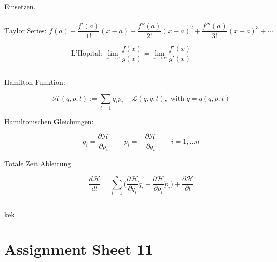 \documentclass{report}
\newcommand{\rm}{\textrm}
\newcommand{\lag}{\mathcal{L}}
\newcommand{\ham}{\mathcal{H}}
\newcommand{\prt}[2]{\frac{\partial #1}{\partial #2}}
\begin{document}
\subsection{}
Einsetzen.

\subsection{}
$$\rm{Taylor Series: }{f(a)+{\frac {f'(a)}{1!}}(x-a)+{\frac{f''(a)}{2!}}(x-a)^{2}+{\frac{f'''(a)}{3!}}(x-a)^{3}+\cdots}$$

$$\rm{L'Hopital: }\lim_{x\rightarrow c}\frac{f(x)}{g(x)}= \lim_{x\rightarrow c}\frac{f'(x)}{g'(x)}$$


\section{}
\begin{description}
\item [Hamilton Funktion:]
$$\ham(q,p,t):={\sum_{i=1}\dot q_i p_i}- \lag( q , \dot q , t ) ,  \textrm{ with  }\dot q = \dot q ( q , p , t )$$
\item [Hamiltonischen Gleichungen:]
$$\dot q_i = \frac{\partial \ham}{\partial p_i} \qquad \dot p_i = -\frac{\partial\ham}{\partial q_i} \qquad i = 1, \dots n$$
\item [Totale Zeit Ableitung]
$$\frac{d \ham}{dt} = \sum_{i=1}^{n} \bigg ( \prt{\ham}{q_i} \dot q_i + \prt{\ham}{p_i} \dot p_i \bigg ) + \prt{\ham}{t}$$
\end{description}
\section{}

kek

\chapter{Assignment Sheet 11}
\end{document}

